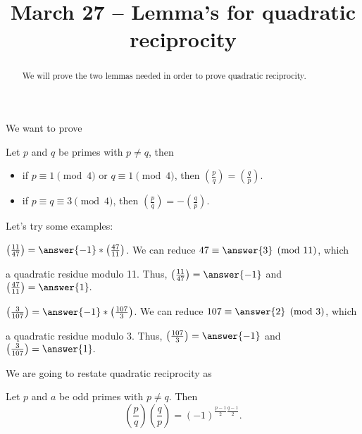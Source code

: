 \documentclass{ximera}
\title{March 27 -- Lemma's for quadratic reciprocity}
\theoremstyle{definition}
\begin{document}
  
\begin{abstract}  
We will prove the two lemmas needed in order to prove quadratic reciprocity.\end{abstract}  
\maketitle  

We want to prove 
\begin{theorem}
 Let $p$ and $q$ be primes with $p\neq q$, then 
\begin{itemize}
 \item if $p\equiv 1 \pmod 4$ or $q\equiv 1 \pmod 4$, then $\left(\frac{p}{q}\right)=\left(\frac{q}{p}\right)$.
 \item if $p\equiv q \equiv 3 \pmod 4$, then $\left(\frac{p}{q}\right)=-\left(\frac{q}{p}\right)$.
\end{itemize}
\end{theorem}

Let's try some examples: 
\begin{question}
 $\left(\frac{11}{47}\right)=\answer{-1}
* \left(\frac{47}{11}\right)$. We can reduce $47\equiv\answer{3}
 \pmod{11}$, which 
\begin{multipleChoice}
\end{multipleChoice}
a quadratic residue modulo 11. Thus,  $\left(\frac{11}{47}\right)=\answer{-1}
$ and $ \left(\frac{47}{11}\right)=\answer{1}
.$ 
\end{question}

\begin{question}
 $\left(\frac{3}{107}\right)=\answer{-1}
* \left(\frac{107}{3}\right)$. We can reduce $107\equiv\answer{2}
 \pmod{3}$, which 
\begin{multipleChoice}
\end{multipleChoice}
a quadratic residue modulo 3. Thus,  $\left(\frac{107}{3}\right)=\answer{-1}
$ and $ \left(\frac{3}{107}\right)=\answer{1}
.$ 
\end{question}

We are going to restate quadratic reciprocity as
\begin{theorem}
 Let $p$ and $a$ be odd primes with $p\neq q$. Then \[\left(\frac{p}{q}\right)\left(\frac{q}{p}\right)=(-1)^{\frac{p-1}{2}\frac{q-1}{2}}.\]
\end{theorem}
\end{document}
